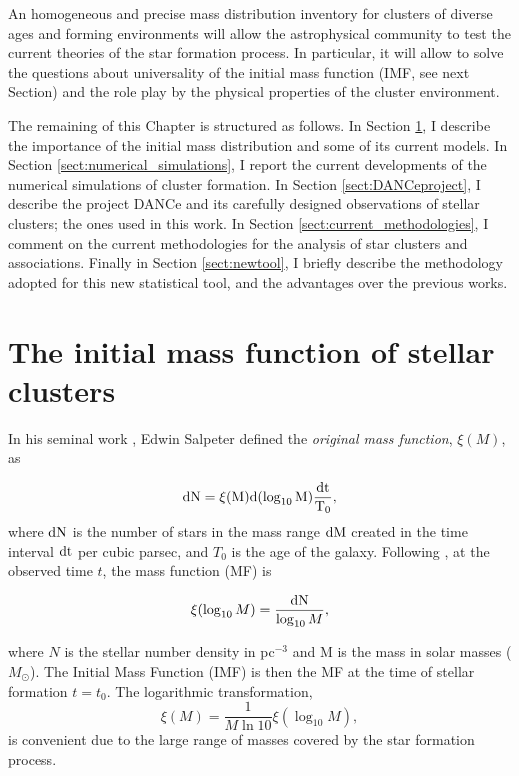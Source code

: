 An homogeneous and precise mass distribution inventory for clusters of diverse ages and forming environments will allow the astrophysical community to test the current theories of the star formation process. In particular, it will allow to solve the questions about universality of the initial mass function (IMF, see next Section) and the role play by the physical properties of the cluster environment.    

The remaining of this Chapter is structured as follows. In Section \ref{sect:IMF}, I describe the importance of the initial mass distribution and some of its current models. In Section \ref{sect:numerical_simulations}, I report the current developments of the numerical simulations of cluster formation. In Section \ref{sect:DANCeproject}, I describe the project DANCe and its carefully designed observations of stellar clusters; the ones used in this work. In Section \ref{sect:current_methodologies}, I comment on the current methodologies for the analysis of star clusters and associations. Finally in Section \ref{sect:newtool}, I briefly describe the methodology adopted for this new statistical tool, and the advantages over the previous works. 

\section{The initial mass function of stellar clusters}
\label{sect:IMF}

In his seminal work \citep{Salpeter1955}, Edwin Salpeter defined the \emph{original mass function}, $\xi(M)$, as

\begin{equation}
\rm{d}N= \xi(M)\rm{d}(\log_{10} M) \frac{\rm{d}t}{T_0},
\end{equation}
where $\rm{d}N$ is the number of stars in the mass range $\rm{d}M$ created in the time interval $\rm{d}t$ per cubic parsec, and $T_0$ is the age of the galaxy. Following \citet{Chabrier2003}, at the observed time $t$, the mass function (MF) is

\begin{equation}
\xi(\log_{10} M)=\frac{\rm{d}N}{\log_{10} M},
\end{equation}

where $N$ is the stellar number density in pc$^{-3}$ and M is the mass in solar masses ($M_{\odot}$). The Initial Mass Function (IMF) is then the MF at the time of stellar formation $t=t_0$. The logarithmic transformation,
\begin{equation}
\xi(M)=\frac{1}{M \ln 10} \xi (\log_{10} M),
\end{equation}
is convenient due to the large range of masses covered by the star formation process.

